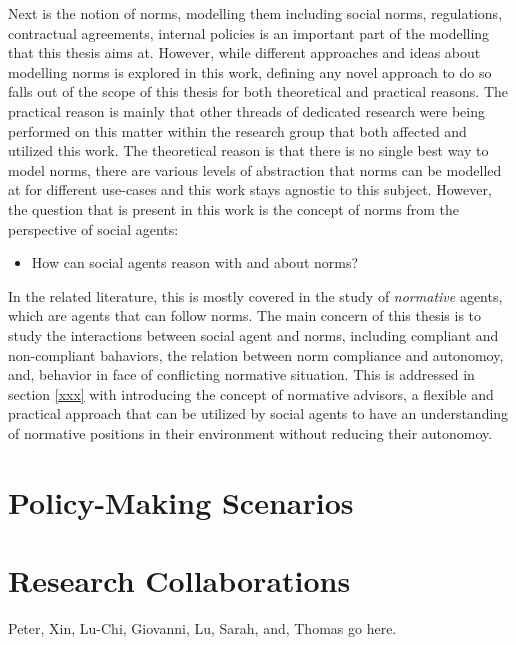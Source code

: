 Next is the notion of norms, modelling them including social norms, regulations, contractual agreements, internal policies is an important part of the modelling that this thesis aims at. However, while different approaches and ideas about modelling norms is explored in this work, defining any novel approach to do so falls out of the scope of this thesis for both theoretical and practical reasons. The practical reason is mainly that other threads of dedicated research were being performed on this matter within the research group that both affected and utilized this work. The theoretical reason is that there is no single best way to model norms, there are various levels of abstraction that norms can be modelled at for different use-cases and this work stays agnostic to this subject. However, the question that is present in this work is the concept of norms from the perspective of social agents:

\begin{itemize}
    \item How can social agents reason with and about norms?
\end{itemize}

In the related literature, this is mostly covered in the study of \textit{normative} agents, which are agents that can follow norms. The main concern of this thesis is to study the interactions between social agent and norms, including compliant and non-compliant bahaviors, the relation between norm compliance and autonomoy, and, behavior in face of conflicting normative situation. This is addressed in section \ref{xxx} with introducing the concept of normative advisors, a flexible and practical approach that can be utilized by social agents to have an understanding of normative positions in their environment without reducing their autonomoy.




\section{Policy-Making Scenarios}


\section{Research Collaborations}
Peter, Xin, Lu-Chi, Giovanni, Lu, Sarah, and, Thomas go here.